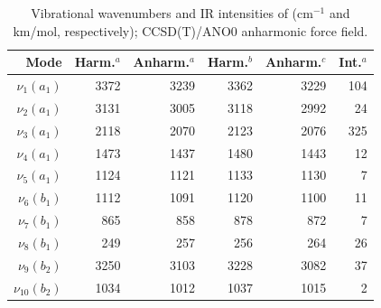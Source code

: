\begin{table}[ht]
   \caption{Vibrational wavenumbers and IR intensities of \lin (cm$^{-1}$ and km/mol, respectively); CCSD(T)/ANO0 anharmonic force field.}
   
    \begin{center}
    \begin{tabular}{rrrrrr} \hline
    
        Mode & Harm.$^a$ & Anharm.$^a$ & Harm.$^b$ & Anharm.$^c$ & Int.$^a$ \\ \hline
        $\nu_{1}(a_1)$  & 3372  & 3239 & 3362 & 3229 & 104  \\ %
        $\nu_{2}(a_1)$  & 3131  & 3005 & 3118 & 2992 &  24  \\ %
        $\nu_{3}(a_1)$  & 2118  & 2070 & 2123 & 2076 & 325  \\ %
        $\nu_{4}(a_1)$  & 1473  & 1437 & 1480 & 1443 &  12  \\ %
        $\nu_{5}(a_1)$  & 1124  & 1121 & 1133 & 1130 &   7  \\ %
        $\nu_{6}(b_1)$  & 1112  & 1091 & 1120 & 1100 &  11  \\ %
        $\nu_{7}(b_1)$  &  865  &  858 &  878 &  872 &   7  \\ %
        $\nu_{8}(b_1)$  &  249  &  257 &  256 &  264 &  26  \\ %
        $\nu_{9}(b_2)$  & 3250  & 3103 & 3228 & 3082 &  37  \\ %
        $\nu_{10}(b_2)$ & 1034  & 1012 & 1037 & 1015 &   2  \\ %

\end{tabular}
\end{center}
\end{table}
